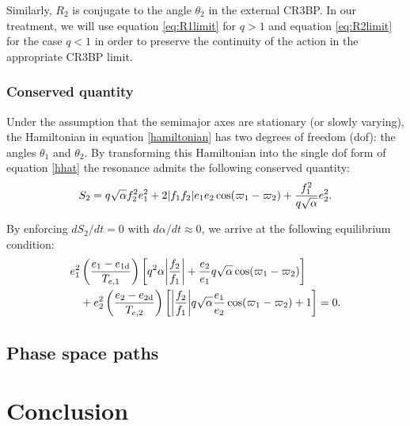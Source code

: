 \documentclass[usenatbib]{mnras}
\DeclarePairedDelimiter{\abs}{|}{|}
\begin{document}
\noindent Similarly, \(R_2\) is conjugate to the angle
\(\theta_2\) in the external CR3BP.
In our treatment, we will use equation \eqref{eq:R1limit}
for \(q>1\) and equation \eqref{eq:R2limit} for the
case \(q<1\) in order to preserve the continuity of the
action in the appropriate CR3BP limit.

\subsubsection{Conserved quantity}
\label{sec:org9dfffcc}
Under the assumption that the semimajor axes are stationary (or slowly
varying), the Hamiltonian in equation \eqref{hamiltonian} has two
degrees of freedom (dof): the angles \(\theta_1\) and \(\theta_2\).  By
transforming this Hamiltonian into the single dof form of equation
\eqref{hhat} the resonance admits the following conserved quantity:
\begin{align}
  \label{eq:s2}
  S_2 = q\sqrt{\alpha}f_2^2e_1^2
+2\abs{f_1f_2}e_1e_2\cos(\varpi_1-\varpi_2) + \frac{f_1^2}{q\sqrt\alpha}e_2^2.
\end{align}

By enforcing \(dS_2/dt = 0\) with \(d\alpha/dt \approx 0\),
we arrive at the following equilibrium condition:
\begin{align}
  e_1^2&\left(\frac{e_1-e_{1\rm d}}{T_{e,1}}\right)
  \left[
  q^2\alpha\abs*{\frac{f_2}{f_1}}
  + \frac{e_2}{e_1}q\sqrt{\alpha}\cos(\varpi_1-\varpi_2)
  \right]\nonumber\\
  &+ e_2^2\left(\frac{e_2-e_{2\rm d}}{T_{e,2}}\right)
  \left[
  \abs*{\frac{f_2}{f_1}} q\sqrt{\alpha}
  \frac{e_1}{e_2}\cos(\varpi_1-\varpi_2) + 1
  \right] = 0.
\end{align}

\subsection{Phase space paths}
\label{sec:org3dd6a4e}
\begin{figure*}
  \centering
  \texttt{[image: \{./relative-geometry]}.png}
  \caption{ }
  \label{fig:relgeom}
\end{figure*}

\section{Conclusion}
\label{sec:orgde96322}

\clearpage

\onecolumn
\appendix
\end{document}
